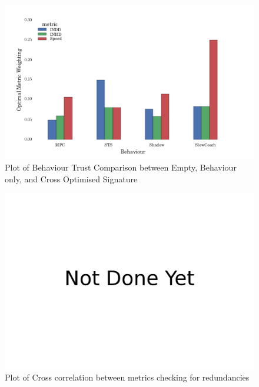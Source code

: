 \documentclass{aamas2016}
\begin{document}
\begin{figure}[h]
	\centering
  \includegraphics[width=\linewidth]{phys_metric_trust_relevance}
	\caption{Plot of Behaviour Trust Comparison between Empty, Behaviour only, and Cross Optimised Signature}
	\label{fig:comms_trust_signature}
\end{figure}

\begin{figure}[h]
	\centering
  \includegraphics[width=\linewidth]{not_done_yet}
	\caption{Plot of Cross correlation between metrics checking for redundancies}
	\label{fig:comms_trust_signature}
\end{figure}
\end{document}
